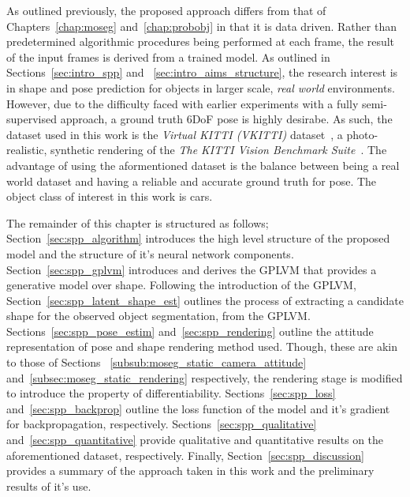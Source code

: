 As outlined previously, the proposed approach differs from that of Chapters~\ref{chap:moseg} and~\ref{chap:probobj} 
in that it is data driven. Rather than predetermined algorithmic procedures being performed at each frame, the 
result of the input frames is derived from a trained model. As outlined in Sections~\ref{sec:intro_spp} and
~\ref{sec:intro_aims_structure}, the research interest is in shape and pose prediction for objects in larger scale, 
\textit{real world} environments. However, due to the difficulty faced with earlier experiments with a fully semi-supervised 
approach, a ground truth 6DoF pose is highly desirabe. As such, the dataset used in this work is the \textit{Virtual KITTI (VKITTI)} 
dataset~\cite{Gaidon2016}, a photo-realistic, synthetic rendering of the \textit{The KITTI Vision Benchmark Suite}~\cite{Geiger2013,Menze2015,Geiger2012}. 
The advantage of using the aformentioned dataset is the balance between being a real world dataset and having a reliable and 
accurate ground truth for pose. The object class of interest in this work is cars.

The remainder of this chapter is structured as follows; Section~\ref{sec:spp_algorithm} introduces the high level 
structure of the proposed model and the structure of it's neural network components. Section~\ref{sec:spp_gplvm} 
introduces and derives the GPLVM that provides a generative model over shape. Following the introduction 
of the GPLVM, Section~\ref{sec:spp_latent_shape_est} outlines the process of extracting a candidate shape for the observed 
object segmentation, from the GPLVM\@. Sections~\ref{sec:spp_pose_estim} and~\ref{sec:spp_rendering} outline the attitude 
representation of pose and shape rendering method used. Though, these are akin to those of Sections
~\ref{subsub:moseg_static_camera_attitude} and~\ref{subsec:moseg_static_rendering} respectively, the rendering stage is 
modified to introduce the property of differentiability. Sections~\ref{sec:spp_loss} and~\ref{sec:spp_backprop} 
outline the loss function of the model and it's gradient for backpropagation, respectively. Sections~\ref{sec:spp_qualitative} 
and~\ref{sec:spp_quantitative} provide qualitative and quantitative results on the aforementioned dataset, respectively. 
Finally, Section~\ref{sec:spp_discussion} provides a summary of the approach taken in this work and the preliminary results 
of it's use.


